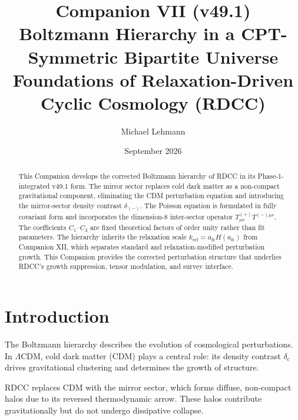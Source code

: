 \documentclass[11pt,a4paper]{article}
\title{\textbf{Companion VII (v49.1)}\\[0.2cm]
\textbf{Boltzmann Hierarchy in a CPT-Symmetric Bipartite Universe}\\[0.2cm]
\large Foundations of Relaxation-Driven Cyclic Cosmology (RDCC)}
\author[1]{Michael Lehmann}
\affil[1]{\small Independent Researcher, Relaxation-Driven Cyclic Cosmology (RDCC)\\
\texttt{mi.lehmann@gmx.de}}
\date{September 2026}
\begin{document}
\maketitle


\begin{abstract}
This Companion develops the corrected Boltzmann hierarchy of RDCC in its
Phase-1-integrated v49.1 form. The mirror sector replaces cold dark matter as a
non-compact gravitational component, eliminating the CDM perturbation equation
and introducing the mirror-sector density contrast \(\delta_{(-)}\). The Poisson
equation is formulated in fully covariant form and incorporates the
dimension-8 inter-sector operator \(T^{(+)}_{\mu\nu}T^{(-)\mu\nu}\). The
coefficients \(C_1\)--\(C_4\) are fixed theoretical factors of order unity rather
than fit parameters. The hierarchy inherits the relaxation scale
\(k_{\mathrm{rel}}=a_{\mathrm{fr}}H(a_{\mathrm{fr}})\) from Companion XII,
which separates standard and relaxation-modified perturbation growth. This
Companion provides the corrected perturbation structure that underlies RDCC's
growth suppression, tensor modulation, and survey interface.
\end{abstract}

\tableofcontents
\newpage


\section{Introduction}

The Boltzmann hierarchy describes the evolution of cosmological perturbations.
In \(\Lambda\)CDM, cold dark matter (CDM) plays a central role: its density
contrast \(\delta_{\mathrm{c}}\) drives gravitational clustering and determines
the growth of structure.

RDCC replaces CDM with the mirror sector, which forms diffuse, non-compact
halos due to its reversed thermodynamic arrow. These halos contribute
gravitationally but do not undergo dissipative collapse.
\end{document}
